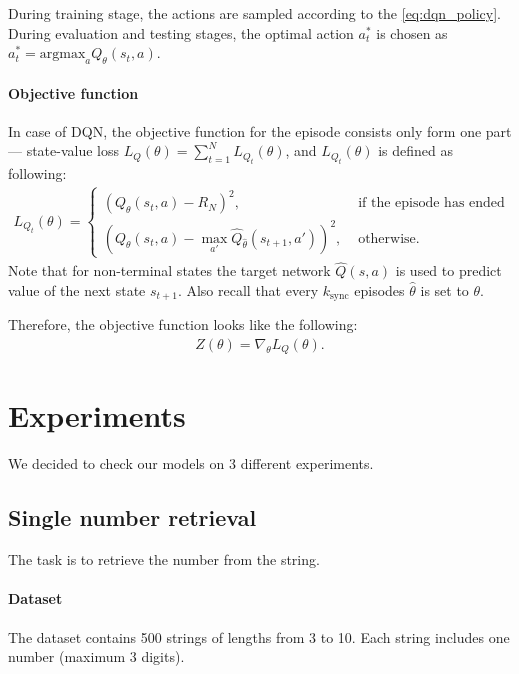 \documentclass{article}
\begin{document}
During training stage, the actions are sampled according to the
\cref{eq:dqn_policy}. During evaluation and testing stages, the optimal action
$a_t^\ast$ is chosen as $a_t^\ast =\text{argmax}_a Q_\theta(s_t,a)$.

\paragraph{Objective function}
In case of DQN, the objective function for the episode consists only form one
part --- state-value loss $L_Q(\theta) = \sum_{t=1}^N L_{Q_t}(\theta)$, and
$L_{Q_t}(\theta)$ is defined as following:
\begin{align*}
  L_{Q_t}(\theta) =
  \begin{cases}
    {(Q_\theta(s_t,a) - R_N)}^2,                                         & \text{ if the episode has ended} \\
    {(Q_\theta(s_t,a) - \max_{a'}\hat{Q}_{\hat{\theta}}(s_{t+1},a'))}^2, & \text{ otherwise}.
  \end{cases}
\end{align*}
Note that for non-terminal states the target network
$\hat{Q}(s,a)$ is used to predict value of the next state $s_{t+1}$.
Also recall that every $k_\text{sync}$ episodes $\hat{\theta}$ is set
to $\theta$.

Therefore, the objective function looks like the following:
\begin{align}
  \label{eq:dqn_objective}
  Z(\theta) = \nabla_\theta L_Q(\theta).
\end{align}





\section{Experiments}
We decided to check our models on 3 different experiments.

\subsection{Single number retrieval}
The task is to retrieve the number from the string.

\paragraph{Dataset}
The dataset contains 500 strings of lengths from 3 to 10. Each string includes one number (maximum 3 digits).
\end{document}
